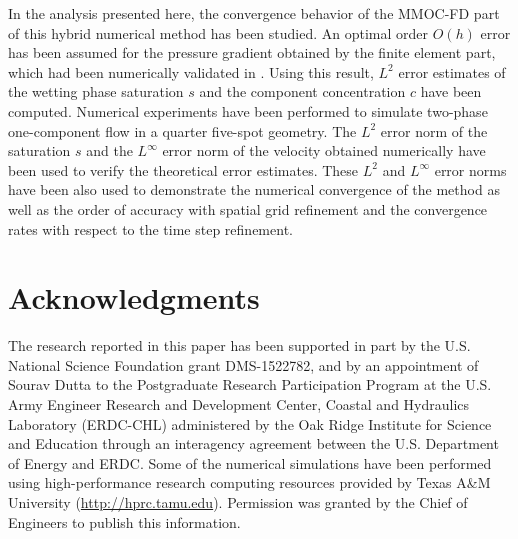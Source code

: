 \documentclass[11pt]{article}
\begin{document}
In the analysis presented here, the convergence behavior of the MMOC-FD part of this hybrid numerical method has been studied. An optimal order $O(h)$ error has been assumed for the pressure gradient obtained by the finite element part, which had been numerically validated in \cite{HWW2010}. Using this result, $L^2$ error estimates of the wetting phase saturation $s$ and the component concentration $c$ have been computed. Numerical experiments have been performed to simulate two-phase one-component flow in a quarter five-spot geometry. The $L^2$ error norm of the saturation $s$ and the $L^\infty$ error norm of the velocity obtained numerically have been used to verify the theoretical error estimates. These $L^2$ and $L^\infty$ error norms have been also used to demonstrate the numerical convergence of the method as well as the order of accuracy with spatial grid refinement and the convergence rates with respect to the time step refinement.

\section*{Acknowledgments}
The research reported in this paper has been supported in part by the U.S. National Science Foundation grant DMS-1522782, and by an appointment of Sourav Dutta to the Postgraduate Research Participation Program at the U.S.
Army Engineer Research and Development Center, Coastal and Hydraulics Laboratory (ERDC-CHL) administered by the Oak Ridge Institute for Science and Education through an interagency agreement between the U.S. Department of Energy and ERDC. Some of the numerical simulations have been performed using high-performance research computing resources provided by Texas A\&M University (\url{http://hprc.tamu.edu}). Permission was granted by the Chief of Engineers to publish this information. 

\normalem


\end{document}
